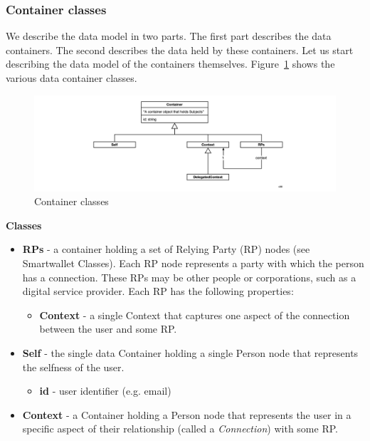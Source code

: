 \documentclass[11pt, oneside]{article}   	%
\begin{document}
\subsubsection{Container classes}

We describe the data model in two parts. The first part describes the data containers. The second describes the data held by these containers. Let us start describing the data model of the containers themselves. Figure~\ref{fig:containers} shows the various data container classes. 

\begin{figure}[h!]
\includegraphics[width=\textwidth]{./images/container-classes.png}
\caption{Container classes}
\label{fig:containers}
\end{figure} 

\textbf{Classes}

\begin{itemize}
	\item \textbf{RPs} - a container holding a set of Relying Party (RP) nodes (see Smartwallet Classes). Each RP node represents a party with which the person has a connection. These RPs may be other people or corporations, such as a digital service provider. Each RP has the following properties:
	\begin{itemize}
		\item \textbf{Context} - a single Context that captures one aspect of the connection between the user and some RP.
	\end{itemize}
	\item \textbf{Self} - the single data Container holding a single Person node that represents the selfness of the user.
	\begin{itemize}
		\item \textbf{id} - user identifier (e.g. email)
	\end{itemize}
	\item \textbf{Context} - a Container holding a Person node that represents the user in a specific aspect of their relationship (called a \emph{Connection}) with some RP. 
\end{itemize}
\end{document}
